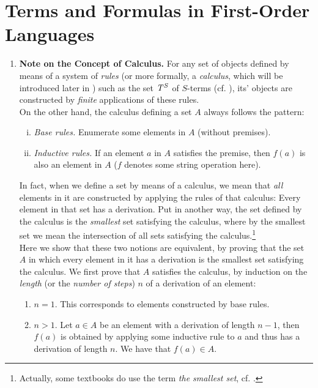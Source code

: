 \section{Terms and Formulas in First-Order Languages}
\begin{enumerate}[1.]
%
\item \textbf{Note on the Concept of Calculus.} For any set of objects defined by means of a system of \emph{rules} (or more formally, a \emph{calculus}, which will be introduced later in ) such as the set ${\mathit{T}_{}^{S}}$ of $S$-terms (cf. ), its' objects are constructed by \emph{finite} applications of these rules.\newline
\\
On the other hand, the calculus defining a set $A$ always follows the pattern:
\begin{enumerate}[(i)]
\item \textit{Base rules.} Enumerate some elements in $A$ (without premises).
\item \textit{Inductive rules.} If an element $a$ in $A$ satisfies the premise, then $f(a)$ is also an element in $A$ ($f$ denotes some string operation here).
\end{enumerate}
In fact, when we define a set by means of a calculus, we mean that \emph{all} elements in it are constructed by applying the rules of that calculus: Every element in that set has a derivation. Put in another way, the set defined by the calculus is the \emph{smallest} set satisfying the calculus, where by the smallest set we mean the intersection of all sets satisfying the calculus.\footnote{Actually, some textbooks do use the term \emph{the smallest set}, cf. \cite{Dirk_van_Dalen}.}\newline
\\
Here we show that these two notions are equivalent, by proving that the set $A$ in which every element in it has a derivation is the smallest set satisfying the calculus. We first prove that $A$ satisfies the calculus, by induction on the \emph{length} (or the \emph{number of steps}) $n$ of a derivation of an element:
\begin{enumerate}[(1)]
\item $n = 1$. This corresponds to elements constructed by base rules.
\item $n > 1$. Let $a \in A$ be an element with a derivation of length $n - 1$, then $f(a)$ is obtained by applying some inductive rule to $a$ and thus has a derivation of length $n$. We have that $f(a) \in A$.

\end{enumerate}
\end{enumerate}
